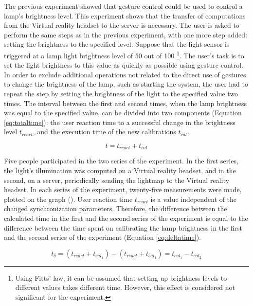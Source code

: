 The previous experiment showed that gesture control could be used to control a lamp's brightness level. This experiment shows that the transfer of computations from the Virtual reality headset to the server is necessary. The user is asked to perform the same steps as in the previous experiment, with one more step added:  setting the brightness to the specified level. Suppose that the light sensor is triggered at a lamp light brightness level of 50 out of 100 \footnote{Using Fitts' law, it can be assumed that setting up brightness levels to different values takes different time. However, this effect is considered not significant for the experiment.}. The user's task is to set the light brightness to this value as quickly as possible using gesture control. In order to exclude additional operations not related to the direct use of gestures to change the brightness of the lamp, such as starting the system, the user had to repeat the step by setting the brightness of the light to the specified value two times. The interval between the first and second times, when the lamp brightness was equal to the specified value, can be divided into two components (Equation \eqref{eq:totaltime}): the user reaction time to a successful change in the brightness level $ t_{react} $, and the execution time of the new calibrations $ t_{cal} $.

\begin{equation}
  t = t_{react} + t_{cal}
  \label{eq:totaltime}
\end{equation}

Five people participated in the two series of the experiment. In the first series, the light's illumination was computed on a Virtual reality headset, and in the second, on a server, periodically sending the lightmap to the Virtual reality headset. In each series of the experiment, twenty-five measurements were made, plotted on the graph (). User reaction time $ t_{react} $ is a value independent of the changed synchronization parameters. Therefore, the difference between the calculated time in the first and the second series of the experiment is equal to the difference between the time spent on calibrating the lamp brightness in the first and the second series of the experiment (Equation \eqref{eq:deltatime}).

\begin{equation}
  t _{\delta} = (t_{react} + t_{cal_1}) - (t_{react} + t_{cal_1}) = t_{cal_1} - t_{cal_2}
  \label{eq:deltatime}
\end{equation}

